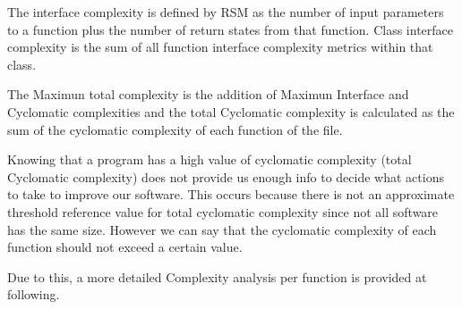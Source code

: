 The interface complexity is defined by RSM as the number of input parameters to a function plus the number of return states from that function. Class interface complexity is the sum of all function interface complexity metrics within that class.

The Maximun total complexity is the addition of Maximun Interface and Cyclomatic complexities and the total Cyclomatic complexity is calculated as the sum of the cyclomatic complexity of each function of the file. 

Knowing that a program has a high value of cyclomatic complexity (total Cyclomatic complexity) does not provide us enough info to decide what actions to take to improve our software. This occurs because there is not an approximate threshold reference value for total cyclomatic complexity since not all software has the same size. However we can say that the cyclomatic complexity of each function should not exceed a certain value.

Due to this, a more detailed Complexity analysis per function is provided at following.

